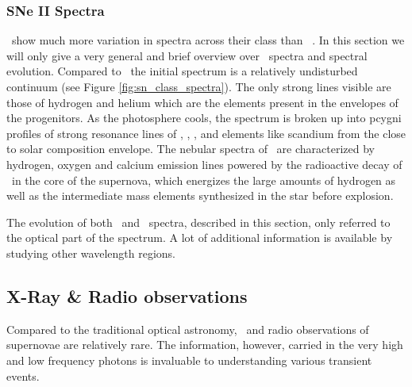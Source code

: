\subsubsection{SNe II Spectra}
\sneii\ show much more variation in spectra across their class than \sneia\ . In this section we will only give a very general and brief overview over \sneii\ spectra and spectral evolution. 
Compared to \sneia\ the initial spectrum is a relatively undisturbed continuum (see Figure \ref{fig:sn_class_spectra}). The only strong lines visible are those of hydrogen and helium which are the elements present in the envelopes of the progenitors. 
As the photosphere cools, the spectrum is broken up into \gls{pcygni} profiles of strong resonance lines of , , , and elements like scandium from the close to solar composition envelope. The nebular spectra of \sneii\ are characterized by hydrogen, oxygen and calcium emission lines powered by the radioactive decay of \Ni\ in the core of the supernova, which energizes the large amounts of hydrogen as well as the intermediate mass elements synthesized in the star before explosion.

The evolution of both \sneia\ and \sneii\ spectra, described in this section, only referred to the optical part of the spectrum. A lot of additional information is available by studying other wavelength regions.

\subsection{X-Ray \& Radio observations}

Compared to the traditional optical astronomy, \xray\ and radio observations of supernovae are relatively rare. The information, however, carried in the very high and low frequency photons is invaluable to understanding various transient events. 

